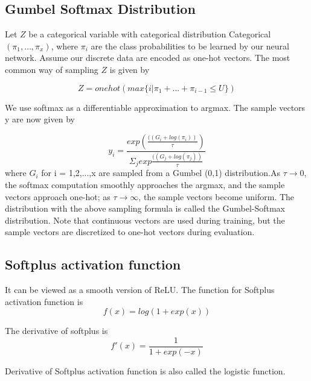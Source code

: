 \documentclass[12 pts]{article}
\begin{document}
\subsection{Gumbel Softmax Distribution}
Let $Z$ be a categorical variable with categorical distribution Categorical $(\pi_1, …, \pi_x)$, where $\pi_i$ are the class probabilities to be learned by our neural network. Assume our discrete data are encoded as one-hot vectors. The most common way of sampling $Z$ is given by

\begin{equation}
Z = onehot(max\{i | \pi_1 + ... + \pi_{i-1} \leq U\})
\end{equation}

We use softmax as a differentiable approximation to argmax. The sample vectors y are now given by

\begin{equation}
y_i = \frac{exp(\frac{((G_i + log(\pi_i))}{\tau})}{\Sigma_j exp\frac{((G_j + log(\pi_j))}{\tau}}
\label{Gumbel Softmax Distribution}
\end{equation}
where $G_i$ for i = 1,2,...,x are sampled from a Gumbel (0,1) distribution.As $\tau \rightarrow 0$, the softmax computation smoothly approaches the argmax, and the sample vectors approach one-hot; as $\tau \rightarrow \infty$, the sample vectors become uniform. The distribution with the above sampling formula is called the Gumbel-Softmax distribution. Note that continuous vectors are used during training, but the sample vectors are discretized to one-hot vectors during evaluation.



\subsection{Softplus activation function}
It can be viewed as a smooth version of ReLU. The function for Softplus activation function is 
\begin{equation}
f(x) = log(1+exp(x))
\label{Softplus activation function}
\end{equation}

The derivative of softplus is 
\begin{equation}
f'(x) = \frac{1}{1+exp(-x)}
\label{Derivative of Softplus activation function}
\end{equation}

Derivative of Softplus activation function is also called the logistic function.
\end{document}
